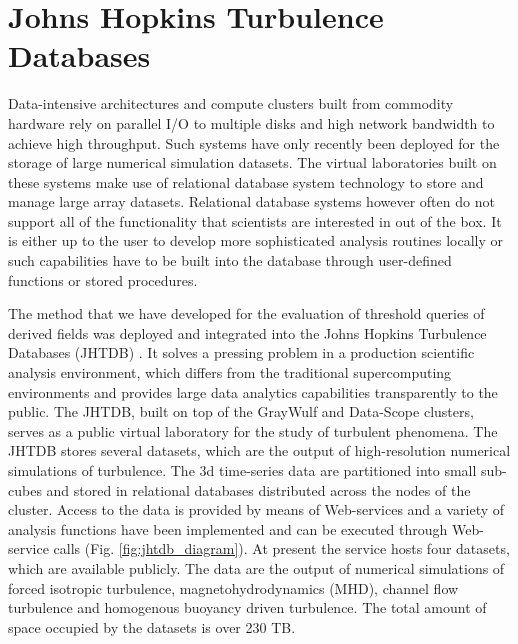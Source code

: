 \documentclass{sig-alternate}
\begin{document}

\section{Johns Hopkins Turbulence\\ Databases}\label{jhtdb}
Data-intensive architectures and compute clusters built from commodity hardware rely on parallel I/O to multiple disks and high network bandwidth
to achieve high throughput. Such systems have only recently been deployed for the storage of large numerical simulation 
datasets. The virtual laboratories built on these systems make use of relational database system technology to store and manage large array datasets.
Relational database systems however often do not support
all of the functionality that scientists are interested in out of the box. It is either up to the user to develop more sophisticated analysis routines locally or such
capabilities have to be built into the database through user-defined functions or stored procedures. 

The method that we have developed for the evaluation of threshold queries of derived fields was deployed and integrated into the 
Johns Hopkins Turbulence Databases (JHTDB) \cite{Yi, Perlman}. It solves a pressing problem in a production scientific analysis environment, which differs 
from the traditional supercomputing environments and provides large data analytics capabilities transparently to the public. 
The JHTDB, built on top of the GrayWulf and Data-Scope clusters, serves as a public virtual laboratory for
the study of turbulent phenomena. The JHTDB stores several datasets, which are the output of high-resolution numerical simulations of turbulence.
The 3d time-series data are partitioned into small sub-cubes and stored in relational databases distributed across the nodes of the cluster.
Access to the data is provided by means of Web-services and a variety of analysis functions have been
implemented and can be executed through Web-service calls (Fig. \ref{fig:jhtdb_diagram}).
At present the service hosts four datasets, which are available publicly. 
The data are the output of numerical simulations of forced isotropic turbulence, magnetohydrodynamics (MHD), channel 
flow turbulence and homogenous buoyancy driven turbulence.
The total amount of space occupied by the datasets is over 230 TB. 
\end{document}
